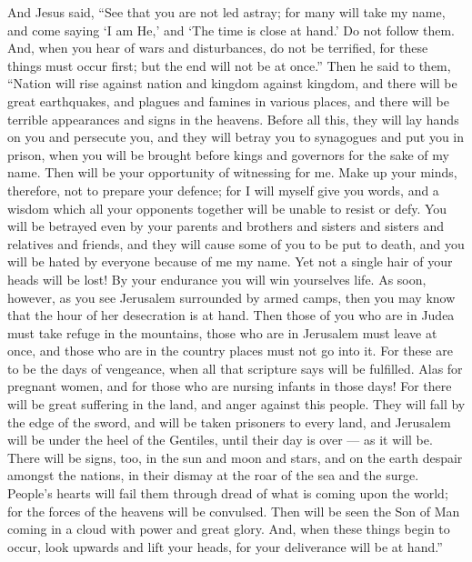  And Jesus said, ``See that you are not led astray; for many
will take my name, and come saying `I am He,' and `The time is close at
hand.' Do not follow them.  And, when you hear of wars and
disturbances, do not be terrified, for these things must occur first;
but the end will not be at once.''  Then he said to them,
``Nation will rise against nation and kingdom against kingdom,
 and there will be great earthquakes, and plagues and
famines in various places, and there will be terrible appearances and
signs in the heavens.  Before all this, they will lay hands
on you and persecute you, and they will betray you to synagogues and put
you in prison, when you will be brought before kings and governors for
the sake of my name.  Then will be your opportunity of
witnessing for me.  Make up your minds, therefore, not to
prepare your defence;  for I will myself give you words,
and a wisdom which all your opponents together will be unable to resist
or defy.  You will be betrayed even by your parents and
brothers and sisters and sisters and relatives and friends, and they
will cause some of you to be put to death,  and you will be
hated by everyone because of me my name.  Yet not a single
hair of your heads will be lost!  By your endurance you
will win yourselves life.  As soon, however, as you see
Jerusalem surrounded by armed camps, then you may know that the hour of
her desecration is at hand.  Then those of you who are in
Judea must take refuge in the mountains, those who are in Jerusalem must
leave at once, and those who are in the country places must not go into
it.  For these are to be the days of vengeance, when all
that scripture says will be fulfilled.  Alas for pregnant
women, and for those who are nursing infants in those days! For there
will be great suffering in the land, and anger against this people.
 They will fall by the edge of the sword, and will be taken
prisoners to every land, and Jerusalem will be under the heel of the
Gentiles, until their day is over --- as it will be.  There
will be signs, too, in the sun and moon and stars, and on the earth
despair amongst the nations, in their dismay at the roar of the sea and
the surge.  People's hearts will fail them through dread of
what is coming upon the world; for the forces of the heavens will be
convulsed.  Then will be seen the Son of Man coming in a
cloud with power and great glory.  And, when these things
begin to occur, look upwards and lift your heads, for your deliverance
will be at hand.''

